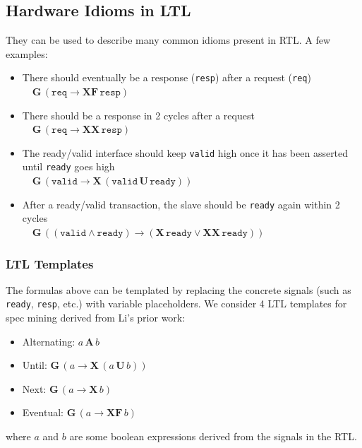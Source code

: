 \documentclass[acmlarge,11pt,nonacm]{acmart}
\begin{document}
\subsection{Hardware Idioms in LTL}
They can be used to describe many common idioms present in RTL. A few examples:
\begin{itemize}
  \item There should eventually be a response (\texttt{resp}) after a request (\texttt{req}) \\
    $\quad \mathbf{G}\, (\mathtt{req} \rightarrow \mathbf{XF}\, \mathtt{resp})$
  \item There should be a response in 2 cycles after a request \\
    $\quad \mathbf{G}\, (\mathtt{req} \rightarrow \mathbf{XX}\, \mathtt{resp})$
  \item The ready/valid interface should keep \texttt{valid} high once it has been asserted until \texttt{ready} goes high \\
    $\quad \mathbf{G}\, (\mathtt{valid} \rightarrow \mathbf{X}\, (\mathtt{valid}\, \mathbf{U}\, \mathtt{ready}))$
  \item After a ready/valid transaction, the slave should be \texttt{ready} again within 2 cycles \\
    $\quad \mathbf{G}\, ((\mathtt{valid} \land \mathtt{ready}) \rightarrow (\mathbf{X}\, \mathtt{ready} \lor \mathbf{XX}\, \mathtt{ready}))$
\end{itemize}

\subsubsection{LTL Templates} \label{templates}
The formulas above can be templated by replacing the concrete signals (such as \texttt{ready}, \texttt{resp}, etc.) with variable placeholders. We consider 4 LTL templates for spec mining derived from Li's prior work\cite{Li_2014}:

\begin{itemize}
  \item Alternating: $a\, \mathbf{A}\, b$
  \item Until: $\mathbf{G}\, (a \rightarrow \mathbf{X}\, (a\, \mathbf{U}\, b))$
  \item Next: $\mathbf{G}\, (a \rightarrow \mathbf{X}\, b)$
  \item Eventual: $\mathbf{G}\, (a \rightarrow \mathbf{X F}\, b)$
\end{itemize}

where $a$ and $b$ are some boolean expressions derived from the signals in the RTL.
\end{document}
